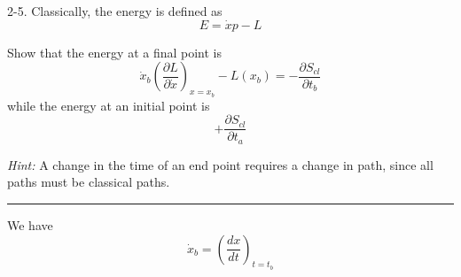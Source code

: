 \documentclass[12pt]{article}
\begin{document}
2-5.
Classically, the energy is defined as
\begin{equation*}
E=\dot xp-L
\tag{2.12}
\end{equation*}

Show that the energy at a final point is
\begin{equation*}
\dot x_b\left(\frac{\partial L}{\partial\dot x}\right)_{x=x_b}
-L(x_b)=-\frac{\partial S_{cl}}{\partial t_b}
\tag{2.13}
\end{equation*}
while the energy at an initial point is
\begin{equation*}
+\frac{\partial S_{cl}}{\partial t_a}
\end{equation*}

{\it Hint:} A change in the time of an end point requires a change in path,
since all paths must be classical paths.

\bigskip
\hrule

\bigskip
We have
\begin{equation*}
\dot x_b=\left(\frac{dx}{dt}\right)_{t=t_b}
\end{equation*}
\end{document}
